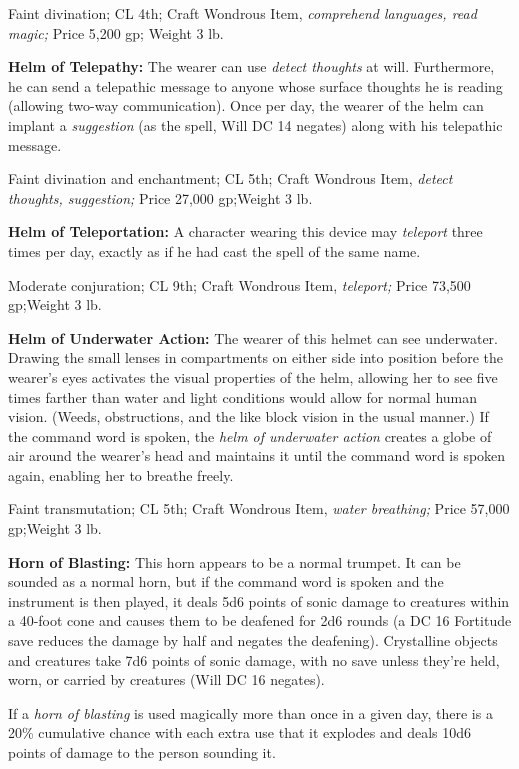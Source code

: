 Faint divination; CL 4th; Craft Wondrous Item, \textit{comprehend languages, read 
magic; }Price 5,200 gp; Weight 3 lb.

\textbf{Helm of Telepathy: }The wearer can use \textit{detect thoughts }at will. 
Furthermore, he can send a telepathic message to anyone whose surface thoughts 
he is reading (allowing two-way communication). Once per day, the wearer of the 
helm can implant a \textit{suggestion }(as the spell, Will DC 14 negates) along 
with his telepathic message.

Faint divination and enchantment; CL 5th; Craft Wondrous Item, \textit{detect thoughts, 
suggestion; }Price 27,000 gp;Weight 3 lb.

\textbf{Helm of Teleportation:} A character wearing this device may \textit{teleport 
}three times per day, exactly as if he had cast the spell of the same name.

Moderate conjuration; CL 9th; Craft Wondrous Item, \textit{teleport; }Price 73,500 
gp;Weight 3 lb.

\textbf{Helm of Underwater Action:} The wearer of this helmet can see underwater. 
Drawing the small lenses in compartments on either side into position before the 
wearer's eyes activates the visual properties of the helm, allowing her to see 
five times farther than water and light conditions would allow for normal human 
vision. (Weeds, obstructions, and the like block vision in the usual manner.) If 
the command word is spoken, the \textit{helm of underwater action }creates a globe 
of air around the wearer's head and maintains it until the command word is spoken 
again, enabling her to breathe freely.

Faint transmutation; CL 5th; Craft Wondrous Item, \textit{water breathing; }Price 
57,000 gp;Weight 3 lb.

\textbf{Horn of Blasting: }This horn appears to be a normal trumpet. It can be 
sounded as a normal horn, but if the command word is spoken and the instrument 
is then played, it deals 5d6 points of sonic damage to creatures within a 40-foot 
cone and causes them to be deafened for 2d6 rounds (a DC 16 Fortitude save reduces 
the damage by half and negates the deafening). Crystalline objects and creatures 
take 7d6 points of sonic damage, with no save unless they're held, worn, or carried 
by creatures (Will DC 16 negates).

If a \textit{horn of blasting }is used magically more than once in a given day, 
there is a 20\% cumulative chance with each extra use that it explodes and deals 
10d6 points of damage to the person sounding it.

